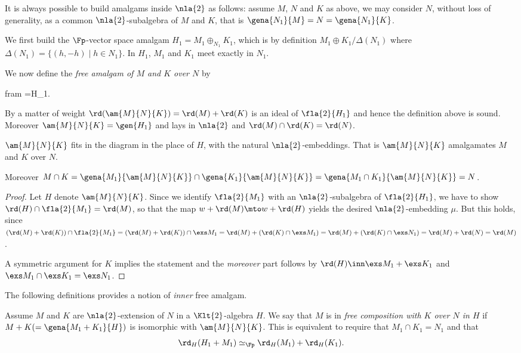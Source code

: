 \smallskip
It is always possible to build amalgams inside $\nla{2}$ as follows: assume $M$, $N$ and $K$ as above, we may consider $N$,
without loss of generality, as a common $\nla{2}$-subalgebra of $M$ and $K$, that is $\gena{N_{1}}{M}=N=\gena{N_{1}}{K}$.

We first build the $\Fp$-vector space amalgam $H_{1}=
M_{1}\oplus_{N_{1}}K_{1}$, %
which is by definition $M_{1}\oplus K_{1}/\Delta(N_1)$ where $\Delta(N_{1})=\{(h,-h)\mid h\in N_{1}\}$.
In $H_{1}$, $M_{1}$ and $K_{1}$ meet exactly in $N_{1}$.

We now define
the {\em free amalgam of $M$ and $K$ over $N$} by
\begin{labeq}{fram}
=H_{1}\oplus{}.
\end{labeq}

By a matter of weight $\rd(\am{M}{N}{K})=\rd(M)+\rd(K)$ is an ideal of $\fla{2}{H_{1}}$
and hence the definition above is sound. Moreover $\am{M}{N}{K}=\gen{H_{1}}$ and lays in $\nla{2}$ and
$\rd(M)\cap\rd(K)=\rd(N)$. 

\smallskip
\begin{rem}
$\am{M}{N}{K}$ fits in the diagram  in the place of $H$, with the natural $\nla{2}$-embeddings. That is
$\am{M}{N}{K}$ amalgamates $M$ and $K$ over $N$.

Moreover $M\cap K=\gena{M_{1}}{\am{M}{N}{K}}\cap\gena{K_{1}}{\am{M}{N}{K}}=\gena{M_{1}\cap K_{1}}{\am{M}{N}{K}}=N$.
\end{rem}
\begin{proof}
Let $H$ denote $\am{M}{N}{K}$. Since we identify $\fla{2}{M_{1}}$ with an $\nla{2}$-subalgebra of $\fla{2}{H_{1}}$, we have to show $\rd(H)\cap\fla{2}{M_{1}}=\rd(M)$,
so that the map $w+\rd(M)\mto w+\rd(H)$ yields the desired $\nla{2}$-embedding $\mu$.
But this holds, since $(\rd(M)+\rd(K))\cap\fla{2}{M_{1}}=(\rd(M)+\rd(K))\cap\exs M_{1}=\rd(M)+(\rd(K)\cap\exs M_{1})
=\rd(M)+(\rd(K)\cap\exs N_{1})=\rd(M)+\rd(N)=\rd(M)$.

A symmetric argument for $K$ implies the statement and the {\em moreover} part follows by
$\rd(H)\inn\exs M_{1}+\exs K_{1}$ and $\exs M_{1}\cap\exs K_{1}=\exs N_{1}$.
\end{proof}

\smallskip
The following definitions provides a notion of {\em inner} free amalgam. 
\begin{dfn}\label{freeco}
Assume $M$ and $K$ are $\nla{2}$-extension of $N$ in a $\Klt{2}$-algebra $H$. %
We say that $M$ is in {\em free composition with $K$ over $N$ in $H$} if $M+K(=\gena{M_{1}+K_{1}}{H})$ %
is isomorphic with $\am{M}{N}{K}$.
This is equivalent to require that
$M_{1}\cap K_{1}=N_{1}$ and %
that $$\rd_{H}(H_{1}+M_{1})\simeq_{\Fp}\rd_{H}(M_{1})+\rd_{H}(K_{1}).$$
\end{dfn}

